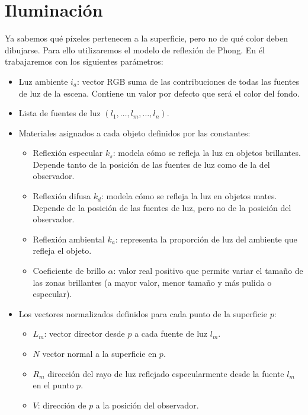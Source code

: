 \section{Iluminación}
Ya sabemos qué píxeles pertenecen a la superficie, pero no de qué color deben dibujarse. Para ello utilizaremos el modelo de reflexión de Phong. En él trabajaremos con los siguientes parámetros:
\begin{itemize}
  \item Luz ambiente $i_a$: vector RGB suma de las contribuciones de todas las fuentes de luz de la escena. Contiene un valor por defecto que será el color del fondo.
  \item Lista de fuentes de luz $(l_1, \dots, l_m, \dots, l_n)$.
  \item Materiales asignados a cada objeto definidos por las constantes:
      \begin{itemize}
          \item Reflexión especular $k_s$: modela cómo se refleja la luz en objetos brillantes. Depende tanto de la posición de las fuentes de luz como de la del observador.
          \item Reflexión difusa $k_d$: modela cómo se refleja la luz en objetos mates. Depende de la posición de las fuentes de luz, pero no de la posición del observador.
          \item Reflexión ambiental $k_a$: representa la proporción de luz del ambiente que refleja el objeto.
          \item Coeficiente de brillo $\alpha$: valor real positivo que permite variar el tamaño de las zonas brillantes (a mayor valor, menor tamaño y más pulida o especular).
      \end{itemize}
  
  \item Los vectores normalizados definidos para cada punto de la superficie $p$:
        \begin{itemize}
          \item $L_m$: vector director desde $p$ a cada fuente de luz $l_m$.
          \item $N$ vector normal a la superficie en $p$.
          \item $R_m$ dirección del rayo de luz reflejado especularmente desde la fuente $l_m$ en el punto $p$.
          \item $V$: dirección de $p$ a la posición del observador.
        \end{itemize}
\end{itemize}

